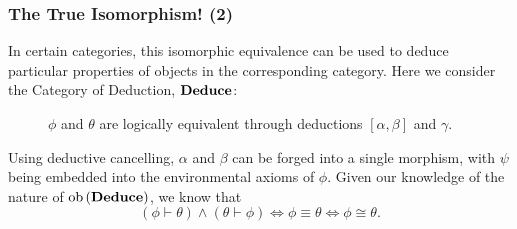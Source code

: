 \documentclass{beamer}
\numberwithin{figure}{section}
\begin{document}
\begin{frame}
        \frametitle{The True Isomorphism! (2)}
        In certain categories, this isomorphic equivalence can be used to deduce
        particular properties of objects in the corresponding category. Here we
        consider the Category of Deduction, $\operatorname{\text{\textbf{Deduce}}}$:
        \pause
        \begin{figure}
                \caption{$\phi$ and $\theta$ are logically equivalent through
                deductions $[\alpha,\beta]$ and $\gamma$.}
        \end{figure}
        \pause
        Using deductive cancelling, $\alpha$ and $\beta$ can be forged into a
        single morphism, with $\psi$ being embedded into the environmental
        axioms of $\phi$.  Given our knowledge of the nature of $\catobj%
        {(\catdeduce)}$, we know that
        \begin{equation*}
                (\phi \vdash \theta) \land (\theta \vdash \phi) \iff
                        \phi \equiv \theta \iff \phi \cong \theta.
        \end{equation*}
\end{frame}
\end{document}
